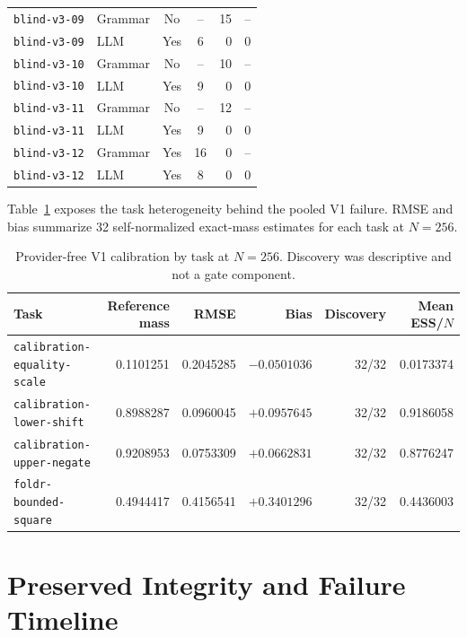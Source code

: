 \documentclass[twoside,11pt]{article}
\begin{document}
\begin{table}[!htbp]
\begin{tabular}{@{}llccrc@{}}
\texttt{blind-v3-09} & Grammar & No  & -- & 15 & -- \\
\texttt{blind-v3-09} & LLM     & Yes &  6 &  0 & 0 \\
\texttt{blind-v3-10} & Grammar & No  & -- & 10 & -- \\
\texttt{blind-v3-10} & LLM     & Yes &  9 &  0 & 0 \\
\texttt{blind-v3-11} & Grammar & No  & -- & 12 & -- \\
\texttt{blind-v3-11} & LLM     & Yes &  9 &  0 & 0 \\
\texttt{blind-v3-12} & Grammar & Yes & 16 &  0 & -- \\
\texttt{blind-v3-12} & LLM     & Yes &  8 &  0 & 0 \\
\bottomrule
\end{tabular}
\end{table}

Table~\ref{tab:calibration-task-results} exposes the task heterogeneity behind
the pooled V1 failure. RMSE and bias summarize 32 self-normalized exact-mass
estimates for each task at $N=256$.

\begin{table}[!htbp]
\centering
\small
\setlength{\tabcolsep}{3pt}
\caption{Provider-free V1 calibration by task at $N=256$. Discovery was
descriptive and not a gate component.}
\label{tab:calibration-task-results}
\begin{tabular}{@{}lrrrrr@{}}
\toprule
Task & Reference mass & RMSE & Bias & Discovery & Mean ESS/$N$ \\
\midrule
\texttt{calibration-equality-scale} & 0.1101251 & 0.2045285 & $-0.0501036$ & 32/32 & 0.0173374 \\
\texttt{calibration-lower-shift}    & 0.8988287 & 0.0960045 & $+0.0957645$ & 32/32 & 0.9186058 \\
\texttt{calibration-upper-negate}   & 0.9208953 & 0.0753309 & $+0.0662831$ & 32/32 & 0.8776247 \\
\texttt{foldr-bounded-square}       & 0.4944417 & 0.4156541 & $+0.3401296$ & 32/32 & 0.4436003 \\
\bottomrule
\end{tabular}
\end{table}

\FloatBarrier

\section{Preserved Integrity and Failure Timeline}
\label{app:integrity}
\end{document}
